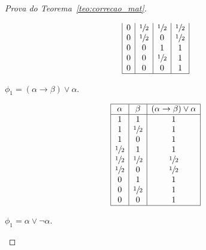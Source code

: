 \begin{proof}[Prova do Teorema~\ref{teo:correcao_mat}]
\begin{provaporcasos}
\begin{provaporsubcasos}
\begin{center}
\[\begin{array}{|c|c|c|c|}
                                0 & \meio{} & \meio{} &\meio{}\\
                                0 & \meio{} & 0 &\meio{}\\
                                0 & 0 & 1 &1\\
                                0 & 0 & \meio{} &1\\
                                0 & 0 & 0 &1\\
                                \hline%
                            \end{array}
                        \]
                    \end{center}

                    
                        
                    \subcasodeprova{} $\phi_{1} = (\alpha \to \beta) \lor \alpha$. 

                    \begin{center}
                        \[
                            \begin{array}{|c|c|c|}%
                                \hline%
                                \alpha      & \beta & (\alpha \to \beta) \lor \alpha \\
                                \hline%
                                1 & 1 & 1\\
                                1 & \meio{} & 1\\
                                1 & 0 & 1\\
                                \meio{} & 1 & 1\\
                                \meio{} & \meio{} & \meio{}\\
                                \meio{} & 0 & \meio{}\\
                                0 & 1 & 1\\
                                0 & \meio{} & 1\\
                                0 & 0 & 1\\
                                \hline%
                            \end{array}
                        \]
                    \end{center}
                        

                    \subcasodeprova{} $\phi_{1} = \alpha \lor \neg \alpha$. 


\end{provaporsubcasos}
\end{provaporcasos}
\end{proof}
